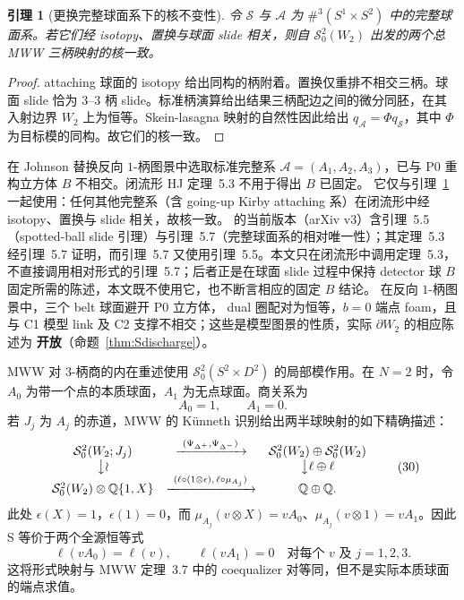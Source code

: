\documentclass[11pt]{amsart}
\newtheorem{lemma}[theorem]{引理}
\theoremstyle{definition}
\theoremstyle{remark}
\newcommand{\Q}{\mathbb{Q}}
\newcommand{\Open}{\textbf{开放}}
\begin{document}
\begin{lemma}[更换完整球面系下的核不变性]
\label{lem:Ssystem}
令 \(\mathcal S\) 与 \(\mathcal A\) 为 \(\#^3(S^1\times S^2)\) 中的完整球面系。若它们经 isotopy、置换与球面 slide 相关，则自 \(\mathcal S^2_0(W_2)\) 出发的两个总 MWW 三柄映射的核一致。
\end{lemma}

\begin{proof}
attaching 球面的 isotopy 给出同构的柄附着。置换仅重排不相交三柄。球面 slide 恰为 \(3\)--\(3\) 柄 slide。标准柄演算给出结果三柄配边之间的微分同胚，在其入射边界 $W_2$ 上为恒等。Skein-lasagna 映射的自然性因此给出 \(q_{\mathcal A}=\Phi q_{\mathcal S}\)，其中 \(\Phi\) 为目标模的同构。故它们的核一致。
\end{proof}

在 Johnson 替换反向 $1$-柄图景中选取标准完整系
\(\mathcal A=(A_1,A_2,A_3)\)，已与 P0 重构立方体 $B$ 不相交。闭流形 HJ 定理~5.3 不用于得出 $B$ 已固定。
它仅与引理~\ref{lem:Ssystem} 一起使用：任何其他完整系（含 going-up Kirby attaching 系）在闭流形中经 isotopy、置换与 slide 相关，故核一致。\cite{HorvatJablonowski2025} 的当前版本（arXiv v3）含引理~5.5（spotted-ball slide 引理）与引理~5.7（完整球面系的相对唯一性）；其定理~5.3 经引理~5.7 证明，而引理~5.7 又使用引理~5.5。本文只在闭流形中调用定理~5.3，不直接调用相对形式的引理~5.7；后者正是在球面 slide 过程中保持 detector 球 $B$ 固定所需的陈述，本文既不使用它，也不断言相应的固定 $B$ 结论。
在反向 $1$-柄图景中，三个 belt 球面避开 P0 立方体，
dual 圈配对为恒等，$b=0$ 端点 foam，且与 C1 模型 link 及 C2 支撑不相交；这些是模型图景的性质，实际 $\partial W_2$ 的相应陈述为 \Open（命题~\ref{thm:Sdischarge}）。

MWW 对 $3$-柄商的内在重述使用 $\mathcal S^2_0(S^2\times D^2)$ 的局部模作用。在 $N=2$ 时，令 $A_0$ 为带一个点的本质球面，$A_1$ 为无点球面。商关系为
\[
A_0=1,\qquad A_1=0.
\]
若 $J_j$ 为 $A_j$ 的赤道，MWW 的 K\"unneth 识别给出两半球映射的如下精确描述：
\[
\begin{array}{ccc}
\mathcal S^2_0(W_2;J_j)&\xrightarrow{\ (\Psi_{\Delta^+},\Psi_{\Delta^-})\ }&
\mathcal S^2_0(W_2)\oplus\mathcal S^2_0(W_2)\\
\big\downarrow\wr&&\big\downarrow{\ell\oplus\ell}\\
\mathcal S^2_0(W_2)\otimes\Q\{1,X\}
&\xrightarrow{\ (\ell\circ(1\otimes\epsilon),\,\ell\circ\mu_{A_j})\ }&
\Q\oplus\Q.
\end{array}
\tag{30}
\]
此处 $\epsilon(X)=1$，$\epsilon(1)=0$，而 $\mu_{A_j}(v\otimes X)=vA_0$、$\mu_{A_j}(v\otimes1)=vA_1$。因此 S 等价于两个全源恒等式
\[
\ell(vA_0)=\ell(v),\qquad \ell(vA_1)=0
\quad\text{对每个 }v\text{ 及 }j=1,2,3.
\tag{31}
\]
这将形式映射与 MWW 定理~3.7 中的 coequalizer 对等同，但不是实际本质球面的端点求值。
\end{document}
